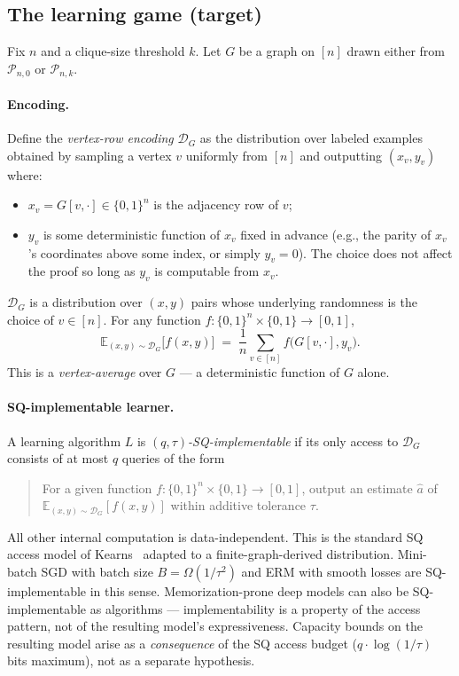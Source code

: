 \documentclass[11pt,a4paper]{article}
\theoremstyle{definition}
\theoremstyle{remark}
\newcommand{\Pnk}{\mathcal{P}_{n,k}}
\newcommand{\Pnzero}{\mathcal{P}_{n,0}}
\newcommand{\DG}{\mathcal{D}_G}
\newcommand{\Ex}{\mathbb{E}}
\newcommand{\bits}{\{0,1\}}
\begin{document}
\subsection{The learning game (target)}

Fix $n$ and a clique-size threshold $k$. Let $G$ be a graph on $[n]$ drawn either from $\Pnzero$ or $\Pnk$.

\paragraph{Encoding.}
Define the \emph{vertex-row encoding} $\DG$ as the distribution over labeled examples obtained by sampling a vertex $v$ uniformly from $[n]$ and outputting $(x_v, y_v)$ where:
\begin{itemize}
  \item $x_v = G[v, \cdot] \in \bits^n$ is the adjacency row of $v$;
  \item $y_v$ is some deterministic function of $x_v$ fixed in advance (e.g., the parity of $x_v$'s coordinates above some index, or simply $y_v = 0$). The choice does not affect the proof so long as $y_v$ is computable from $x_v$.
\end{itemize}
$\DG$ is a distribution over $(x, y)$ pairs whose underlying randomness is the choice of $v \in [n]$. For any function $f \colon \bits^n \times \bits \to [0, 1]$,
\[
\Ex_{(x, y) \sim \DG}\bigl[f(x, y)\bigr] \;=\; \frac{1}{n} \sum_{v \in [n]} f\bigl(G[v, \cdot], y_v\bigr).
\]
This is a \emph{vertex-average} over $G$ --- a deterministic function of $G$ alone.

\paragraph{SQ-implementable learner.}
A learning algorithm $L$ is \emph{$(q, \tau)$-SQ-implementable} if its only access to $\DG$ consists of at most $q$ queries of the form
\begin{quote}
For a given function $f \colon \bits^n \times \bits \to [0, 1]$, output an estimate $\widehat{a}$ of $\Ex_{(x, y) \sim \DG}[f(x, y)]$ within additive tolerance $\tau$.
\end{quote}
All other internal computation is data-independent. This is the standard SQ access model of Kearns~\cite{Kearns98} adapted to a finite-graph-derived distribution. Mini-batch SGD with batch size $B = \Omega(1/\tau^2)$ and ERM with smooth losses are SQ-implementable in this sense. Memorization-prone deep models can also be SQ-implementable as algorithms --- implementability is a property of the access pattern, not of the resulting model's expressiveness. Capacity bounds on the resulting model arise as a \emph{consequence} of the SQ access budget ($q \cdot \log(1/\tau)$ bits maximum), not as a separate hypothesis.
\end{document}

